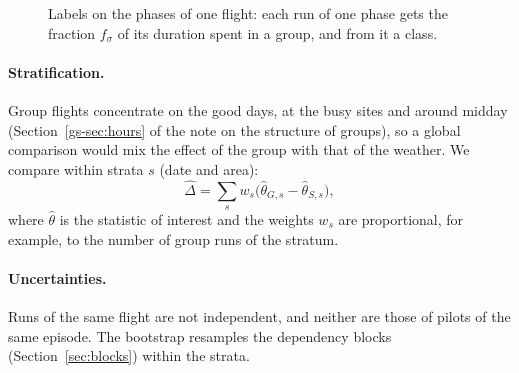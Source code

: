 \begin{figure}
\centering
{}
\caption{Labels on the phases of one flight: each run of one phase gets the fraction $f_\sigma$ of
its duration spent in a group, and from it a class.}
\label{fig:segments}
\end{figure}

\paragraph{Stratification.} Group flights concentrate on the good days, at the busy sites and
around midday (Section~\ref{gs-sec:hours} of the note on the structure of groups), so a global
comparison would mix the effect of the group with that of the weather. We compare within strata $s$ (date and area):
\begin{equation}\label{eq:strata}
  \hat\Delta=\sum_s w_s\bigl(\hat\theta_{G,s}-\hat\theta_{S,s}\bigr),
\end{equation}
where $\hat\theta$ is the statistic of interest and the weights $w_s$ are proportional, for
example, to the number of group runs of the stratum.

\paragraph{Uncertainties.} Runs of the same flight are not independent, and neither are those of
pilots of the same episode. The bootstrap resamples the dependency blocks (Section~\ref{sec:blocks})
within the strata.

